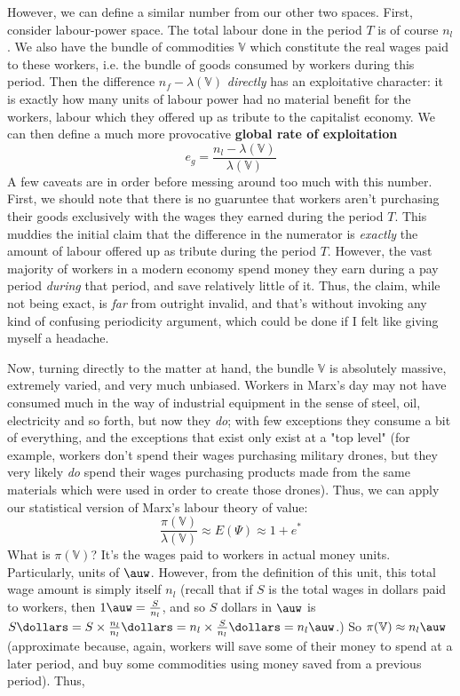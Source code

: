 However, we can define a similar number from our other two spaces. First, consider labour-power space. The total labour done in the period $T$ is of course $n_l$. We also have the bundle of commodities $\mathbb{V}$ which constitute the real wages paid to these workers, i.e. the bundle of goods consumed by workers during this period. Then the difference $n_f - \lambda(\mathbb{V})$ \textit{directly} has an exploitative character: it is exactly how many units of labour power had no material benefit for the workers, labour which they offered up as tribute to the capitalist economy. We can then define a much more provocative \textbf{global rate of exploitation}
\[ e_g = \frac{n_l - \lambda(\mathbb{V})}{\lambda(\mathbb{V})} \]
A few caveats are in order before messing around too much with this number. First, we should note that there is no guaruntee that workers aren't purchasing their goods exclusively with the wages they earned during the period $T$. This muddies the initial claim that the difference in the numerator is \textit{exactly} the amount of labour offered up as tribute during the period $T$. However, the vast majority of workers in a modern economy spend money they earn during a pay period \textit{during} that period, and save relatively little of it. Thus, the claim, while not being exact, is \textit{far} from outright invalid, and that's without invoking any kind of confusing periodicity argument, which could be done if I felt like giving myself a headache. \par 
Now, turning directly to the matter at hand, the bundle $\mathbb{V}$ is absolutely massive, extremely varied, and very much unbiased. Workers in Marx's day may not have consumed much in the way of industrial equipment in the sense of steel, oil, electricity and so forth, but now they \textit{do}; with few exceptions they consume a bit of everything, and the exceptions that exist only exist at a "top level" (for example, workers don't spend their wages purchasing military drones, but they very likely \textit{do} spend their wages purchasing products made from the same materials which were used in order to create those drones). Thus, we can apply our statistical version of Marx's labour theory of value:
\[ \frac{\pi(\mathbb{V})}{\lambda(\mathbb{V})} \approx E(\Psi) \approx 1+e^* \]
What is $\pi(\mathbb{V})$? It's the wages paid to workers in actual money units. Particularly, units of $\auw$. However, from the definition of this unit, this total wage amount is simply itself $n_l$ (recall that if $S$ is the total wages in dollars paid to workers, then $1\auw = \frac{S}{n_l}$, and so $S$ dollars in $\auw$ is $S \dollars = S \times \frac{n_l}{n_l} \dollars = n_l \times \frac{S}{n_l} \dollars = n_l \auw$.) So $\pi(\mathbb{V}) \approx n_l \auw$ (approximate because, again, workers will save some of their money to spend at a later period, and buy some commodities using money saved from a previous period). Thus,
